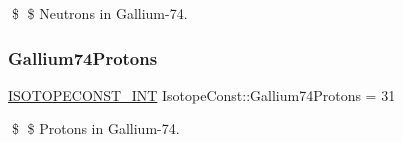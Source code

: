 \$ \$ Neutrons in Gallium-\/74. \mbox{\label{group___isotope_const-_gallium-_ga74_ga9be44783bcfaef512b002ed97303b619}} 
\subsubsection{\texorpdfstring{Gallium74\+Protons}{Gallium74Protons}}
{\footnotesize\ttfamily \mbox{\hyperlink{group___isotope_const-_macros_ga5f18360b3e99483a35c32d789e62621c}{I\+S\+O\+T\+O\+P\+E\+C\+O\+N\+S\+T\+\_\+\+I\+NT}} Isotope\+Const\+::\+Gallium74\+Protons = 31}

\$ \$ Protons in Gallium-\/74. 